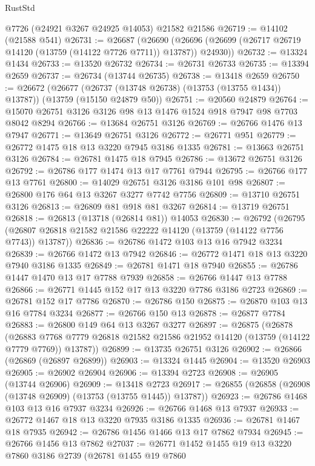 \begin{lexlean}{RustStd}
\begin{coremodule}
    @7726
    (@24921 @3267 @24925 @14053)
    @21582
    @21586
@26719 := @14102 (@21588 @541)
@26731 := @26687
    (@26690 (@26696 (@26699 (@26717 @26719 @14120 (@13759 (@14122 @7726 @7711)) @13787)) @24930))
@26732 := @13324 @1434
@26733 := @13520 @26732
@26734 := @26731 @26733
@26735 := @13394 @2659
@26737 := @26734 (@13744 @26735)
@26738 := @13418 @2659
@26750 := @26672
    (@26677 (@26737 (@13748 @26738) (@13753 (@13755 @1434)) @13787))
    (@13759 (@15150 @24879 @50))
@26751 := @20560 @24879
@26764 := @15070 @26751 @3126 @3126 @98 @13 @1476 @1524 @918 @7947 @98 @7703 @8042 @8294
@26766 := @13684 @26751 @3126
@26769 := @26766 @1476 @13 @7947
@26771 := @13649 @26751 @3126
@26772 := @26771 @951
@26779 := @26772 @1475 @18 @13 @3220 @7945 @3186 @1335
@26781 := @13663 @26751 @3126
@26784 := @26781 @1475 @18 @7945
@26786 := @13672 @26751 @3126
@26792 := @26786 @177 @1474 @13 @17 @7761 @7944
@26795 := @26766 @177 @13 @7761
@26800 := @14029 @26751 @3126 @3186 @101 @98
@26807 := @26800 @176 @64 @13 @3267 @3277 @7742 @7756
@26809 := @13710 @26751 @3126
@26813 := @26809 @81 @918 @81 @3267
@26814 := @13719 @26751
@26818 := @26813 (@13718 (@26814 @81)) @14053
@26830 := @26792
    (@26795 (@26807 @26818 @21582 @21586 @22222 @14120 (@13759 (@14122 @7756 @7743)) @13787))
@26836 := @26786 @1472 @103 @13 @16 @7942 @3234
@26839 := @26766 @1472 @13 @7942
@26846 := @26772 @1471 @18 @13 @3220 @7940 @3186 @1335
@26849 := @26781 @1471 @18 @7940
@26855 := @26786 @1447 @1470 @13 @17 @7788 @7939
@26858 := @26766 @1447 @13 @7788
@26866 := @26771 @1445 @152 @17 @13 @3220 @7786 @3186 @2723
@26869 := @26781 @152 @17 @7786
@26870 := @26786 @150
@26875 := @26870 @103 @13 @16 @7784 @3234
@26877 := @26766 @150 @13
@26878 := @26877 @7784
@26883 := @26800 @149 @64 @13 @3267 @3277
@26897 := @26875
    (@26878
      (@26883 @7768 @7779 @26818 @21582 @21586 @21952 @14120 (@13759 (@14122 @7779 @7769)) @13787))
@26899 := @13735 @26751 @3126
@26902 := @26866 (@26869 (@26897 @26899))
@26903 := @13324 @1445
@26904 := @13520 @26903
@26905 := @26902 @26904
@26906 := @13394 @2723
@26908 := @26905 (@13744 @26906)
@26909 := @13418 @2723
@26917 := @26855 (@26858 (@26908 (@13748 @26909) (@13753 (@13755 @1445)) @13787))
@26923 := @26786 @1468 @103 @13 @16 @7937 @3234
@26926 := @26766 @1468 @13 @7937
@26933 := @26772 @1467 @18 @13 @3220 @7935 @3186 @1335
@26936 := @26781 @1467 @18 @7935
@26942 := @26786 @1456 @1466 @13 @17 @7862 @7934
@26945 := @26766 @1456 @13 @7862
@27037 := @26771
    @1452
    @1455
    @19
    @13
    @3220
    @7860
    @3186
    @2739
    (@26781
      @1455
      @19
      @7860

\end{coremodule}
\end{lexlean}

